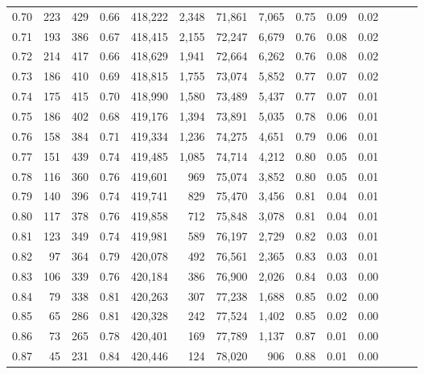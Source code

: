 \begin{tabular}{rrrrrrrrrrrrrr}
0.70 &     223 &    429 &  0.66 &  418,222 &    2,348 &  71,861 &   7,065 &  0.75 &  0.09 &      0.02 \\
0.71 &     193 &    386 &  0.67 &  418,415 &    2,155 &  72,247 &   6,679 &  0.76 &  0.08 &      0.02 \\
0.72 &     214 &    417 &  0.66 &  418,629 &    1,941 &  72,664 &   6,262 &  0.76 &  0.08 &      0.02 \\
0.73 &     186 &    410 &  0.69 &  418,815 &    1,755 &  73,074 &   5,852 &  0.77 &  0.07 &      0.02 \\
0.74 &     175 &    415 &  0.70 &  418,990 &    1,580 &  73,489 &   5,437 &  0.77 &  0.07 &      0.01 \\
0.75 &     186 &    402 &  0.68 &  419,176 &    1,394 &  73,891 &   5,035 &  0.78 &  0.06 &      0.01 \\
0.76 &     158 &    384 &  0.71 &  419,334 &    1,236 &  74,275 &   4,651 &  0.79 &  0.06 &      0.01 \\
0.77 &     151 &    439 &  0.74 &  419,485 &    1,085 &  74,714 &   4,212 &  0.80 &  0.05 &      0.01 \\
0.78 &     116 &    360 &  0.76 &  419,601 &      969 &  75,074 &   3,852 &  0.80 &  0.05 &      0.01 \\
0.79 &     140 &    396 &  0.74 &  419,741 &      829 &  75,470 &   3,456 &  0.81 &  0.04 &      0.01 \\
0.80 &     117 &    378 &  0.76 &  419,858 &      712 &  75,848 &   3,078 &  0.81 &  0.04 &      0.01 \\
0.81 &     123 &    349 &  0.74 &  419,981 &      589 &  76,197 &   2,729 &  0.82 &  0.03 &      0.01 \\
0.82 &      97 &    364 &  0.79 &  420,078 &      492 &  76,561 &   2,365 &  0.83 &  0.03 &      0.01 \\
0.83 &     106 &    339 &  0.76 &  420,184 &      386 &  76,900 &   2,026 &  0.84 &  0.03 &      0.00 \\
0.84 &      79 &    338 &  0.81 &  420,263 &      307 &  77,238 &   1,688 &  0.85 &  0.02 &      0.00 \\
0.85 &      65 &    286 &  0.81 &  420,328 &      242 &  77,524 &   1,402 &  0.85 &  0.02 &      0.00 \\
0.86 &      73 &    265 &  0.78 &  420,401 &      169 &  77,789 &   1,137 &  0.87 &  0.01 &      0.00 \\
0.87 &      45 &    231 &  0.84 &  420,446 &      124 &  78,020 &     906 &  0.88 &  0.01 &      0.00 \\

\end{tabular}
